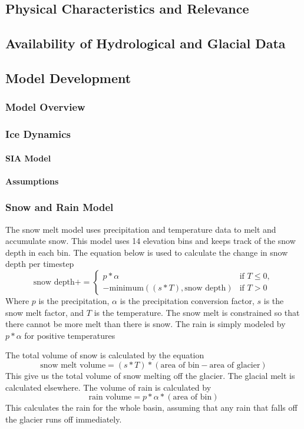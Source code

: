 \documentclass{article}
\begin{document}
\subsection{Physical Characteristics and Relevance}

\subsection{Availability of Hydrological and Glacial Data}

\subsection{Model Development}
\subsubsection{Model Overview}

\subsubsection{Ice Dynamics}
\paragraph{SIA Model} 
\paragraph{Assumptions}

\subsubsection{Snow and Rain Model}
The snow melt model uses precipitation and temperature data to melt and accumulate snow. This model uses 14 elevation bins and keeps track 
of the snow depth in each bin. The equation below is used to calculate the change in snow depth per timestep 
$$\text{snow depth} += 
\begin{cases} 
  p*\alpha & \text{if } T \leq 0,\\
  -\text{minimum}((s*T),\text{snow depth}) & \text{if } T > 0
\end{cases}$$
Where $p$ is the precipitation, $\alpha$ is the precipitation conversion factor, $s$ is the snow melt factor, and $T$ is 
the temperature. The snow melt is constrained so that there cannot be more melt than there is snow. The rain is simply modeled by $p*\alpha$ 
for positive temperatures

The total volume of snow is calculated by the equation
$$\text{snow melt volume}=(s*T)*(\text{area of bin}-\text{area of glacier})$$
This give us the total volume of snow melting off the glacier. The glacial melt is calculated elsewhere. The volume of rain is calculated by
$$\text{rain volume}=p*\alpha*(\text{area of bin})$$
This calculates the rain for the whole basin, assuming that any rain that falls off the glacier runs off immediately.
\end{document}
